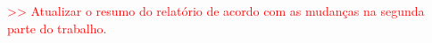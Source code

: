 \documentclass[a4paper,11pt]{scrreprt}
\begin{document}



\makecover



%
%



\renewenvironment{abstract}
 {\par\noindent\textbf{\Large\abstractname}\par\bigskip}
 {}

\begin{flushleft}
\begin{abstract}

    \textcolor{red}{>> Atualizar o resumo do relatório de acordo com as mudanças na segunda parte do trabalho.}

\end{abstract}
\end{flushleft}

\pagebreak


\end{document}
